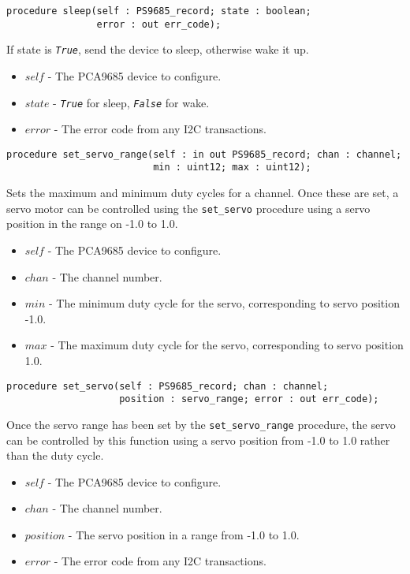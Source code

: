 \documentclass[10pt, openany]{book}
\newcommand{\function}[1]{\texttt{#1}}
\newcommand{\constant}[1]{\emph{\texttt{#1}}}
\begin{document}
\begin{lstlisting}
procedure sleep(self : PS9685_record; state : boolean;
                error : out err_code);
\end{lstlisting}
If state is \constant{True}, send the device to sleep, otherwise wake it up.
\begin{itemize}
  \item $self$ - The PCA9685 device to configure.
  \item $state$ - \constant{True} for sleep, \constant{False} for wake.
  \item $error$ - The error code from any I2C transactions.
\end{itemize}

\begin{lstlisting}
procedure set_servo_range(self : in out PS9685_record; chan : channel;
                          min : uint12; max : uint12);
\end{lstlisting}
Sets the maximum and minimum duty cycles for a channel.  Once these are set, a servo motor can be controlled using the \function{set\_servo} procedure using a servo position in the range on -1.0 to 1.0.
\begin{itemize}
  \item $self$ - The PCA9685 device to configure.
  \item $chan$ - The channel number.
  \item $min$ - The minimum duty cycle for the servo, corresponding to servo position -1.0.
  \item $max$ - The maximum duty cycle for the servo, corresponding to servo position 1.0.
\end{itemize}

\begin{lstlisting}
procedure set_servo(self : PS9685_record; chan : channel;
                    position : servo_range; error : out err_code);
\end{lstlisting}
Once the servo range has been set by the \function{set\_servo\_range} procedure, the servo can be controlled by this function using a servo position from -1.0 to 1.0 rather than the duty cycle.
\begin{itemize}
  \item $self$ - The PCA9685 device to configure.
  \item $chan$ - The channel number.
  \item $position$ - The servo position in a range from -1.0 to 1.0.
  \item $error$ - The error code from any I2C transactions.
\end{itemize}
\end{document}
